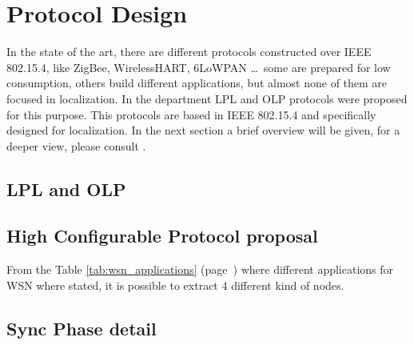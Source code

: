 \chapter{Protocol Design}
\label{chap:protocoldesign}

In the state of the art, there are different protocols constructed over \ac{IEEE} 802.15.4, like ZigBee, WirelessHART, 6LoWPAN \ldots \ some
are prepared for low consumption, others build different applications, but almost none of them are focused in localization. In the
department \ac{LPL} and \ac{OLP} \cite{LPLandOLP} protocols were proposed for this purpose. This protocols are based in \ac{IEEE} 802.15.4 and specifically 
designed for localization. In the next section a brief overview will be given, for a deeper view, please consult \cite{LPLandOLP}.

\section{\ac{LPL} and \ac{OLP}}



\section{High Configurable Protocol proposal}

From the Table \ref{tab:wsn_applications} (page~\pageref{tab:wsn_applications}) where different applications for \ac{WSN} where stated, it is possible
to extract 4 different kind of nodes.

\section{Sync Phase detail}
